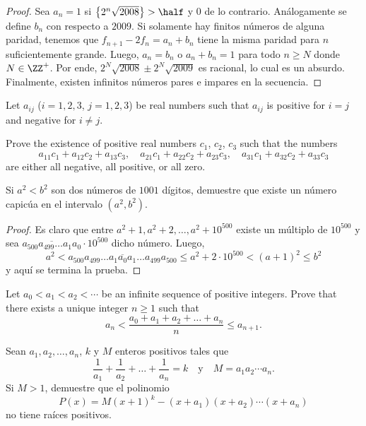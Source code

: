 \begin{proof}
	Sea $a_n=1$ si $\left\{2^n\sqrt{2008}\right\}>\half$ y $0$ de lo contrario. Análogamente se define $b_n$ con respecto a $2009$. Si solamente hay finitos números de alguna paridad, tenemos que $f_{n+1}-2f_n=a_n+b_n$ tiene la misma paridad para $n$ suficientemente grande. Luego, $a_n=b_n$ o $a_n+b_n=1$ para todo $n\ge N$ donde $N\in\ZZ^+$. Por ende, $2^N\sqrt{2008}\pm2^N\sqrt{2009}$ es racional, lo cual es un absurdo. Finalmente, existen infinitos números pares e impares en la secuencia.
\end{proof}

\begin{probEB}
	Let $a_{ij}$ ($i=1,2,3$, $j=1,2,3$) be real numbers such that $a_{ij}$ is positive for $i=j$ and negative for $i\ne j$.

	Prove the existence of positive real numbers $c_{1}$, $c_{2}$, $c_{3}$ such that the numbers
	\[a_{11}c_{1}+a_{12}c_{2}+a_{13}c_{3},\quad a_{21}c_{1}+a_{22}c_{2}+a_{23}c_{3},\quad a_{31}c_{1}+a_{32}c_{2}+a_{33}c_{3}\]
	are either all negative, all positive, or all zero.
\end{probEB}

\begin{probEG}
	Si $a^2<b^2$ son dos números de $1001$ dígitos, demuestre que existe un número capicúa en el intervalo $(a^2,b^2)$.
\end{probEG}

\begin{proof}
	Es claro que entre $a^2+1,a^2+2,\dots,a^2+10^{500}$ existe un múltiplo de $10^{500}$ y sea $\overline{a_{500}a_{499}\dots a_1a_0}\cdot 10^{500}$ dicho número. Luego,
	\[a^2<\overline{a_{500}a_{499}\dots a_1a_0a_1\dots a_{499}a_{500}}\le a^2+2\cdot 10^{500}<(a+1)^2\le b^2\]
	y aquí se termina la prueba.
\end{proof}

\begin{probEG}[IMO 2014/1]
	Let $a_0<a_1<a_2<\cdots$ be an infinite sequence of positive integers. Prove that there exists a unique integer $n\ge 1$ such that
	\[a_n<\frac{a_0+a_1+a_2+\dots+a_n}{n}\le a_{n+1}.\]
\end{probEG}

\begin{probEG}
	Sean $a_1,a_2,\dots,a_n$, $k$ y $M$ enteros positivos tales que
	\[\frac{1}{a_1}+\frac{1}{a_2}+\dots+\frac{1}{a_n}=k\quad\text{y}\quad M=a_1a_2\cdots a_n.\]
	Si $M>1$, demuestre que el polinomio
	\[P(x)=M(x+1)^k-(x+a_1)(x+a_2)\cdots(x+a_n)\]
	no tiene raíces positivos.
\end{probEG}

